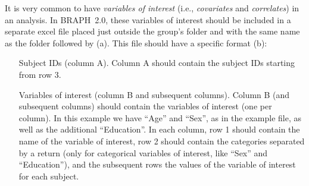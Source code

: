 \documentclass[justified]{tufte-handout}
\begin{document}
It is very common to have \emph{variables of interest} (i.e., \emph{covariates} and \emph{correlates}) in an analysis. In BRAPH~2.0, 
these variables of interest should be included in a separate excel file placed just outside the group's folder and with the same name as the folder followed by  (a). This file should have a specific format (b):
\begin{itemize}

\item[Subject IDs (column A).]
Column A should contain the subject IDs starting from row 3.

\item[Variables of interest (column B and subsequent columns).]
Column B (and subsequent columns) should contain the variables of interest (one per column). 
In this example we have ``Age'' and ``Sex'', as in the example file, as well as the additional ``Education''.
In each column, row 1 should contain the name of the variable of interest, row 2 should contain the categories separated by a return (only for categorical variables of interest, like ``Sex'' and ``Education''), and the subsequent rows the values of the variable of interest for each subject.

\end{itemize}	
\end{document}
